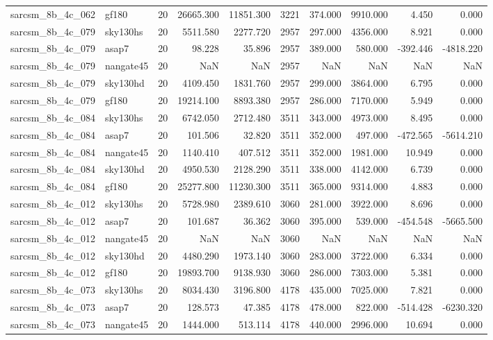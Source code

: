 \begin{tabular}{llrrrrrrrr}
sarcsm\_8b\_4c\_062 & gf180 & 20 & 26665.300 & 11851.300 & 3221 & 374.000 & 9910.000 & 4.450 & 0.000 \\
sarcsm\_8b\_4c\_079 & sky130hs & 20 & 5511.580 & 2277.720 & 2957 & 297.000 & 4356.000 & 8.921 & 0.000 \\
sarcsm\_8b\_4c\_079 & asap7 & 20 & 98.228 & 35.896 & 2957 & 389.000 & 580.000 & -392.446 & -4818.220 \\
sarcsm\_8b\_4c\_079 & nangate45 & 20 & NaN & NaN & 2957 & NaN & NaN & NaN & NaN \\
sarcsm\_8b\_4c\_079 & sky130hd & 20 & 4109.450 & 1831.760 & 2957 & 299.000 & 3864.000 & 6.795 & 0.000 \\
sarcsm\_8b\_4c\_079 & gf180 & 20 & 19214.100 & 8893.380 & 2957 & 286.000 & 7170.000 & 5.949 & 0.000 \\
sarcsm\_8b\_4c\_084 & sky130hs & 20 & 6742.050 & 2712.480 & 3511 & 343.000 & 4973.000 & 8.495 & 0.000 \\
sarcsm\_8b\_4c\_084 & asap7 & 20 & 101.506 & 32.820 & 3511 & 352.000 & 497.000 & -472.565 & -5614.210 \\
sarcsm\_8b\_4c\_084 & nangate45 & 20 & 1140.410 & 407.512 & 3511 & 352.000 & 1981.000 & 10.949 & 0.000 \\
sarcsm\_8b\_4c\_084 & sky130hd & 20 & 4950.530 & 2128.290 & 3511 & 338.000 & 4142.000 & 6.739 & 0.000 \\
sarcsm\_8b\_4c\_084 & gf180 & 20 & 25277.800 & 11230.300 & 3511 & 365.000 & 9314.000 & 4.883 & 0.000 \\
sarcsm\_8b\_4c\_012 & sky130hs & 20 & 5728.980 & 2389.610 & 3060 & 281.000 & 3922.000 & 8.696 & 0.000 \\
sarcsm\_8b\_4c\_012 & asap7 & 20 & 101.687 & 36.362 & 3060 & 395.000 & 539.000 & -454.548 & -5665.500 \\
sarcsm\_8b\_4c\_012 & nangate45 & 20 & NaN & NaN & 3060 & NaN & NaN & NaN & NaN \\
sarcsm\_8b\_4c\_012 & sky130hd & 20 & 4480.290 & 1973.140 & 3060 & 283.000 & 3722.000 & 6.334 & 0.000 \\
sarcsm\_8b\_4c\_012 & gf180 & 20 & 19893.700 & 9138.930 & 3060 & 286.000 & 7303.000 & 5.381 & 0.000 \\
sarcsm\_8b\_4c\_073 & sky130hs & 20 & 8034.430 & 3196.800 & 4178 & 435.000 & 7025.000 & 7.821 & 0.000 \\
sarcsm\_8b\_4c\_073 & asap7 & 20 & 128.573 & 47.385 & 4178 & 478.000 & 822.000 & -514.428 & -6230.320 \\
sarcsm\_8b\_4c\_073 & nangate45 & 20 & 1444.000 & 513.114 & 4178 & 440.000 & 2996.000 & 10.694 & 0.000 \\

\end{tabular}
